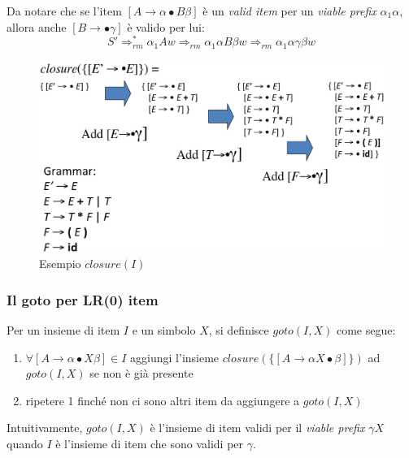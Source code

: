 Da notare che se l'item $[A \to \alpha\bullet B\beta]$ \`e un
\textit{valid item} per un \textit{viable prefix} $\alpha_1\alpha$, allora anche
$[B \to \bullet\gamma]$ \`e valido per lui:
$$S' \Rightarrow^*_{rm} \alpha_1 Aw \Rightarrow_{rm} \alpha_1\alpha B\beta w
\Rightarrow_{rm} \alpha_1\alpha\gamma\beta w$$

\begin{figure}[H]
\centering
\includegraphics[scale=0.4]{res/image/closure_item}
\caption{Esempio $closure(I)$}
\label{img:closure_item}
\end{figure}

\subsubsection{Il goto per LR(0) item}
\begin{definition}
Per un insieme di item $I$ e un simbolo $X$, si definisce $goto(I,X)$ come
segue:
\begin{enumerate}
\item $\forall [A \to \alpha \bullet X\beta] \in I$  aggiungi l'insieme
$closure(\{[A \to \alpha X \bullet\beta]\})$ ad $goto(I,X)$ se non \`e gi\`a
presente
\item ripetere 1 finch\'e non ci sono altri item da aggiungere a $goto(I,X)$
\end{enumerate}
\end{definition}

Intuitivamente, $goto(I,X)$ \`e l'insieme di item validi per il \textit{viable
prefix} $\gamma X$ quando $I$ \`e l'insieme di item che sono validi per
$\gamma$.

